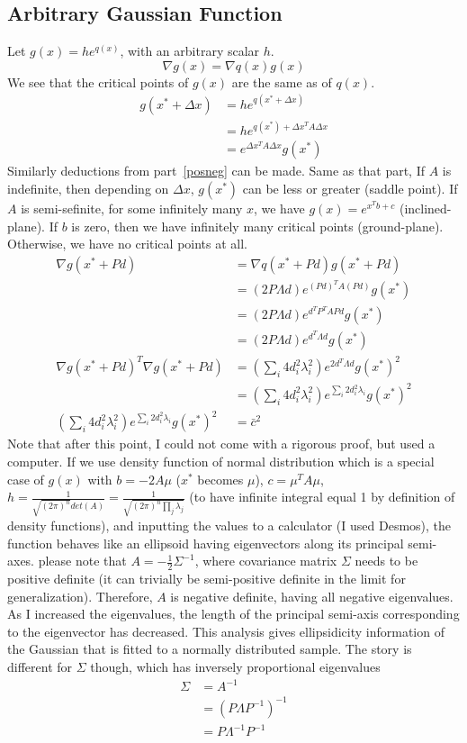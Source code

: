\documentclass{book}
\numberwithin{equation}{subsection}
\begin{document}
\subsection{Arbitrary Gaussian Function}
Let $g(x) = he^{q(x)}$, with an arbitrary scalar $h$.
\begin{equation}
    \nabla g(x) = \nabla q(x) g(x)
\end{equation}
We see that the critical points of $g(x)$ are the same as of $q(x)$.
\begin{align}
    g(x^*+\Delta x) &= he^{q(x^*+\Delta x)}\\
     &= he^{q(x^*) + \Delta x^TA\Delta x}\\
     &= e^{\Delta x^TA\Delta x}g(x^*)
\end{align}
Similarly deductions from part~\ref{posneg} can be made. Same as that part, If $A$ is indefinite, then depending on $\Delta x$, $g(x^*)$ can be less or greater (saddle point). If $A$ is semi-sefinite, for some infinitely many $x$, we have $g(x) = e^{x^Tb+c}$ (inclined-plane). If $b$ is zero, then we have infinitely many critical points (ground-plane). Otherwise, we have no critical points at all.
\begin{align}
    \nabla g(x^*+Pd) &= \nabla q(x^*+Pd) g(x^*+Pd)\\
    &= (2P\Lambda d) e^{(Pd)^TA(Pd)}g(x^*)\\
    &= (2P\Lambda d) e^{d^TP^TAPd}g(x^*)\\
    &= (2P\Lambda d) e^{d^T\Lambda d}g(x^*)\\
    \nabla g(x^*+Pd)^T \nabla g(x^*+Pd) &= (\sum_i 4d_i^2\lambda_i^2)e^{2d^T\Lambda d}g(x^*)^2\\
    &= (\sum_i 4d_i^2\lambda_i^2)e^{\sum_i 2d_i^2\lambda_i}g(x^*)^2\\
    (\sum_i 4d_i^2\lambda_i^2)e^{\sum_i 2d_i^2\lambda_i}g(x^*)^2 &= \bar{c}^2
\end{align}
Note that after this point, I could not come with a rigorous proof, but used a computer.
If we use density function of normal distribution which is a special case of $g(x)$ with $b=-2A\mu$ ($x^*$ becomes $\mu$), $c=\mu^TA\mu$, $h = \frac{1}{\sqrt{(2\pi)^n}det(A)} = \frac{1}{\sqrt{(2\pi)^n\prod_j \lambda_j}}$ (to have infinite integral equal 1 by definition of density functions), and inputting the values to a calculator (I used Desmos), the function behaves like an ellipsoid having eigenvectors along its principal semi-axes. please note that $A=-\frac{1}{2}\Sigma^{-1}$, where covariance matrix $\Sigma$ needs to be positive definite (it can trivially be semi-positive definite in the limit for generalization). Therefore, $A$ is negative definite, having all negative eigenvalues. As I increased the eigenvalues, the length of the principal semi-axis corresponding to the eigenvector has decreased.
This analysis gives ellipsidicity information of the Gaussian that is fitted to a normally distributed sample. The story is different for $\Sigma$ though, which has inversely proportional eigenvalues 
\begin{align*}
    \Sigma &= A^{-1}\\ 
    &= (P\Lambda P^{-1})^{-1}\\
    &= P\Lambda^{-1} P^{-1}
\end{align*}
\end{document}
